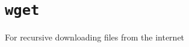     
    
    

    
    \section{\texorpdfstring{\texttt{wget}}{wget}}\label{wget}

For recursive downloading files from the internet


    
    
    
